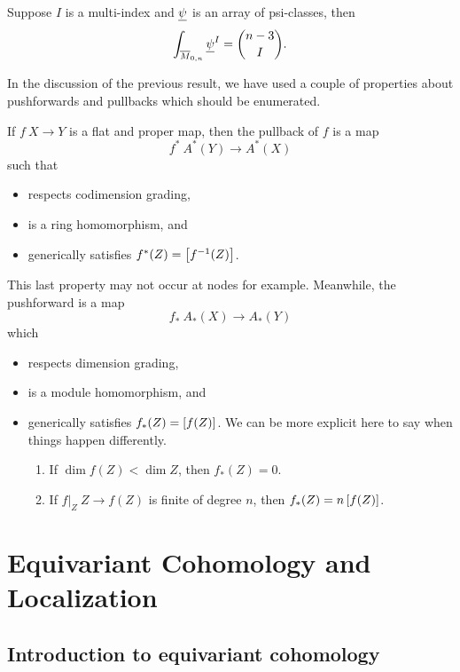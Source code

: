 \documentclass[12pt]{memoir}
\begin{document}
\begin{Th}
    Suppose $I$ is a multi-index and $\underline\psi$ is an array of psi-classes, then 
    $$\int_{\overline{M}_{0,n}}\underline\psi^I=\binom{n-3}{I}.$$
\end{Th}

In the discussion of the previous result, we have used a couple of properties about pushforwards and pullbacks which should be enumerated.

\begin{Rmk}
    If $f\: X\to Y$ is a flat and proper map, then the pullback of $f$ is a map 
    $$f^\ast\: A^\ast(Y)\to A^\ast(X)$$
    such that
    \begin{itemize}
        \item respects codimension grading,
        \item is a ring homomorphism, and 
        \item generically satisfies $f^\ast(Z)=\left\lbrack f^{-1}(Z)\right\rbrack$. 
    \end{itemize}
    This last property may not occur at nodes for example. Meanwhile, the pushforward is a map
    $$f_\ast\: A_\ast(X)\to A_\ast(Y)$$
    which
    \begin{itemize}
        \item respects dimension grading,
        \item is a module homomorphism, and
        \item generically satisfies $f_\ast(Z)=\left\lbrack f(Z)\right\rbrack$. We can be more explicit here to say when things happen differently. 
        \begin{enumerate}
            \item If $\dim f(Z)<\dim Z$, then $f_\ast(Z)=0$.
            \item If $\left.f\right|_Z\:Z\to f(Z)$ is finite of degree $n$, then $f_\ast(Z)=n\left\lbrack f(Z)\right\rbrack$.
        \end{enumerate}
    \end{itemize}
\end{Rmk}

\chapter{Equivariant Cohomology and Localization}

\section{Introduction to equivariant cohomology}
\end{document}
